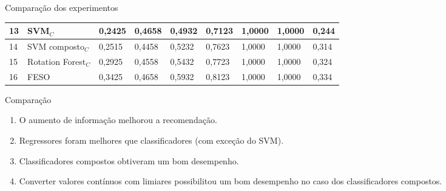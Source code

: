 \begin{frame}
\begin{block}{Comparação dos experimentos}
\begin{table}[!htp]
\begin{tabular}{|l|l|l|l|l|l|l|l|l|}
\rowcolor{amarelo}	13 & SVM\(_C\)    			& 0,2425 & 0,4658 & 0,4932 & 0,7123 & 1,0000 & 1,0000 & 0,244 \\ \hline
\rowcolor{azul}		14 & SVM composto\(_C\)		& 0,2515 & 0,4458 & 0,5232 & 0,7623 & 1,0000 & 1,0000 & 0,314 \\ \hline
\rowcolor{azul}		15 & Rotation Forest\(_C\)  & 0,2925 & 0,4558 & 0,5432 & 0,7723 & 1,0000 & 1,0000 & 0,324 \\ \hline
\rowcolor{vermelho}	16 & FESO          			& 0,3425 & 0,4658 & 0,5932 & 0,8123 & 1,0000 & 1,0000 & 0,334 \\ \hline
			\end{tabular}
		\end{table}
		\egroup
		
	\end{block}
\end{frame}



\begin{frame}
	\begin{block}{Comparação}
		\begin{enumerate}
			\item O aumento de informação melhorou a recomendação.
			\item Regressores foram melhores que classificadores (com exceção do SVM).
			\item Classificadores compostos obtiveram um bom desempenho.
			\item Converter valores contínuos com limiares possibilitou um bom desempenho no caso dos classificadores compostos.
		\end{enumerate}
		
	\end{block}
\end{frame}

